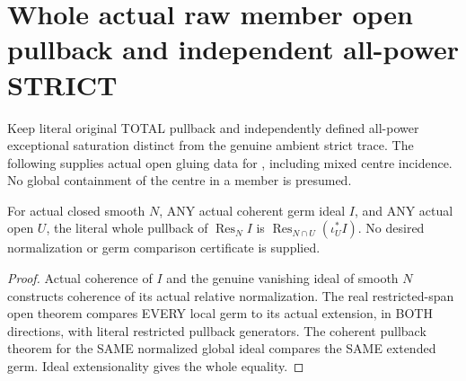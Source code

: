 \section{Whole actual raw member open pullback and independent all-power STRICT}

Keep literal original TOTAL pullback and independently defined all-power
exceptional saturation distinct from the genuine ambient strict trace.
The following supplies actual open gluing data for
\cite[Remark~12.6, pp.~293--295]{bierstone-milman97-invent-math}, including
mixed centre incidence. No global containment of the centre in a member
is presumed.

\begin{lemma}
\label{hir:sharp-actual-relative-normalization-whole-open-pullback}
\leanok
For actual closed smooth $N$, ANY actual coherent germ ideal $I$, and ANY
actual open $U$, the literal whole pullback of $\operatorname{Res}_NI$
is $\operatorname{Res}_{N\cap U}(\iota_U^*I)$. No desired normalization
or germ comparison certificate is supplied.
\end{lemma}
\begin{proof}
Actual coherence of $I$ and the genuine vanishing ideal of smooth $N$
constructs coherence of its actual relative normalization. The real
restricted-span open theorem compares EVERY local germ to its actual
extension, in BOTH directions, with literal restricted pullback generators.
The coherent pullback theorem for the SAME normalized global ideal compares
the SAME extended germ. Ideal extensionality gives the whole equality.
\end{proof}

